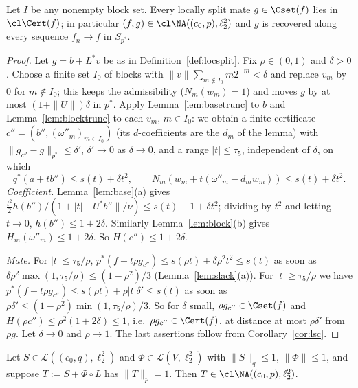 \begin{theorem}\label{thm:locsplit}
Let $I$ be any nonempty block set.  Every locally split mate
$g\in\Cset(f)$ lies in $\cl\Cert(f)$; in particular $(f,g)\in
\cl\NA((c_0,p),\ell_2^2)$ and $g$ is recovered along every sequence
$f_n\to f$ in $S_{p^*}$.
\end{theorem}

\begin{proof}
Let $g=b+L^*v$ be as in Definition~\ref{def:locsplit}.  Fix $\rho\in(0,1)$
and $\delta>0$.  Choose a finite set $I_0$ of blocks with
$\|v\|\sum_{m\notin I_0}m2^{-m}<\delta$ and replace $v_m$ by $0$ for
$m\notin I_0$; this keeps the admissibility ($N_m(w_m)=1$) and moves $g$ by
at most $(1+\|U\|)\delta$ in $p^*$.  Apply Lemma~\ref{lem:basetrunc} to $b$ and
Lemma~\ref{lem:blocktrunc} to each $v_m$, $m\in I_0$: we obtain a finite
certificate $c''=(b'',(\omega''_m)_{m\in I_0})$ \textup{(}its $d$-coefficients
are the $d_m$ of the lemma\textup{)} with $\|g_{c''}-g\|_{p^*}\le\delta'$,
$\delta'\to0$ as $\delta\to0$, and a range $|t|\le\tau_5$, independent of
$\delta$, on which
\[
 q^*(a+tb'')\le s(t)+\delta t^2,\qquad
 N_m(w_m+t(\omega''_m-d_mw_m))\le s(t)+\delta t^2 .
\]
\emph{Coefficient.}  Lemma~\ref{lem:base}(a) gives
$\frac{t^2}2h(b'')/(1+|t|\|U^*b''\|/\nu)\le s(t)-1+\delta t^2$; dividing
by $t^2$ and letting $t\to0$, $h(b'')\le1+2\delta$.  Similarly
Lemma~\ref{lem:block}(b) gives $H_m(\omega''_m)\le1+2\delta$.  So
$H(c'')\le1+2\delta$.

\emph{Mate.}  For $|t|\le\tau_5/\rho$,
$p^*(f+t\rho g_{c''})\le s(\rho t)+\delta\rho^2t^2\le s(t)$ as soon as
$\delta\rho^2\max(1,\tau_5/\rho)\le(1-\rho^2)/3$ (Lemma~\ref{lem:slack}(a)).
For $|t|\ge\tau_5/\rho$ we have $p^*(f+t\rho g_{c''})\le s(\rho
t)+\rho|t|\delta'\le s(t)$ as soon as
$\rho\delta'\le(1-\rho^2)\min(1,\tau_5/\rho)/3$.  So
for $\delta$ small, $\rho g_{c''}\in\Cset(f)$ and $H(\rho c'')\le
\rho^2(1+2\delta)\le1$, i.e.\ $\rho g_{c''}\in\Cert(f)$, at distance at most
$\rho\delta'$ from $\rho g$.  Let $\delta\to0$ and $\rho\to1$.  The last
assertions follow from Corollary~\ref{cor:lsc}.
\end{proof}

\begin{corollary}\label{cor:splitcontractive}
Let $S\in\mathcal L((c_0,q),\ell_2^2)$ and $\Phi\in\mathcal L(V,\ell_2^2)$
with $\|S\|_q\le1$, $\|\Phi\|\le1$, and suppose $T:=S+\Phi\circ L$ has
$\|T\|_p=1$.  Then $T\in\cl\NA((c_0,p),\ell_2^2)$.
\end{corollary}

